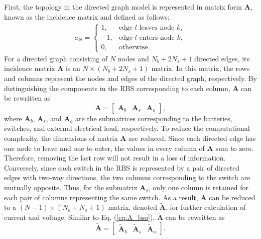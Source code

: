 \documentclass{article}
\begin{document}
First, the topology in the directed graph model is represented in matrix form $\bm{A}$, known as the incidence matrix and defined as follows:
\begin{align}\label{eq:A}
    a_{kl}=
    \begin{cases}
        1,  & \text{edge $l$ leaves node $k$},\\
        -1, & \text{edge $l$ enters node $k$},\\
        0,  & \text{otherwise}.
    \end{cases}
\end{align}
For a directed graph consisting of $N$ nodes and $N_b+2N_s+1$ directed edges, its incidence matrix $\bm{A}$ is an $N\times(N_b+2N_s+1)$ matrix. 
In this matrix, the rows and columns represent the nodes and edges of the directed graph, respectively.
By distinguishing the components in the RBS corresponding to each column, $\bm{A}$ can be rewritten as
\begin{equation}\label{eq:A_bso}
    \bm{A} =
    \begin{bmatrix}
        \bm{A}_b & \bm{A}_s & \bm{A}_o
    \end{bmatrix},
\end{equation}
where $\bm{A}_b$, $\bm{A}_s$, and $\bm{A}_o$ are the submatrices corresponding to the batteries, switches, and external electrical load, respectively.
To reduce the computational complexity, the dimensions of matrix $\bm{A}$ are reduced.
Since each directed edge has one node to leave and one to enter, the values in every column of $\bm{A}$ sum to zero.
Therefore, removing the last row will not result in a loss of information. 
Conversely, since each switch in the RBS is represented by a pair of directed edges with two-way directions, the two columns corresponding to the switch are mutually opposite.
Thus, for the submatrix $\bm{A}_s$, only one column is retained for each pair of columns representing the same switch.
As a result, $\bm{A}$ can be reduced to a $(N-1)\times(N_b+N_s+1)$ matrix, denoted $\bm{\tilde{A}}$, for further calculation of current and voltage.
Similar to Eq. (\ref{eq:A_bso}), $\bm{\tilde{A}}$ can be rewritten as
\begin{equation}\label{eq:A_bso_tilde}
    \bm{\tilde{A}} =
    \begin{bmatrix}
        \bm{\tilde{A}}_b & \bm{\tilde{A}}_s & \bm{\tilde{A}}_o
    \end{bmatrix}.
\end{equation}
\end{document}
